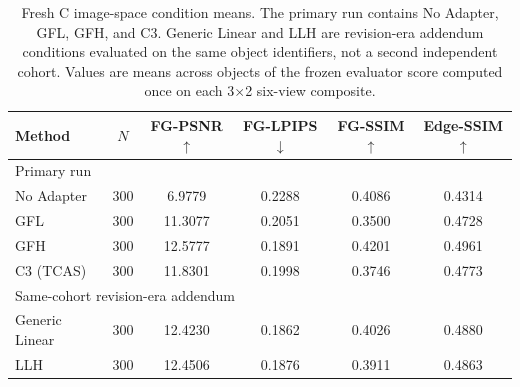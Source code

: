 \documentclass[times,twocolumn,final]{elsarticle}
\providecommand{\DIFadd}[1]{{\protect\color{blue} \sf #1}} %
\providecommand{\DIFaddbegin}{} %
\providecommand{\DIFaddend}{} %
\providecommand{\DIFaddFL}[1]{\DIFadd{#1}} %
\providecommand{\DIFaddbeginFL}{\DIFaddbegin} %
\providecommand{\DIFaddendFL}{\DIFaddend} %
\renewcommand{\DIFaddbeginFL}{}
\renewcommand{\DIFaddendFL}{}
\renewcommand{\DIFaddFL}[1]{#1}
\begin{document}
 
 \DIFaddbeginFL \begin{table}[t]
\DIFaddendFL \centering
  \DIFaddbeginFL \caption{Fresh C image-space condition means. The primary run contains No Adapter, GFL, GFH, and C3. Generic Linear and LLH are revision-era addendum conditions evaluated on the same object identifiers, not a second independent cohort. Values are means across objects of the frozen evaluator score computed once on each 3$\times$2 six-view composite.}
\label{tab:freshc-absolute}
\scriptsize\setlength{\tabcolsep}{4pt}
\begin{tabular}{lccccc}
\DIFaddendFL \toprule
  \DIFaddbeginFL \DIFaddFL{Method }\DIFaddendFL &   \DIFaddbeginFL \DIFaddFL{$N$ }\DIFaddendFL &   \DIFaddbeginFL \DIFaddFL{FG-PSNR$\uparrow$ }\DIFaddendFL &   \DIFaddbeginFL \DIFaddFL{FG-LPIPS$\downarrow$ }\DIFaddendFL &   \DIFaddbeginFL \DIFaddFL{FG-SSIM$\uparrow$ }& \DIFaddFL{Edge-SSIM$\uparrow$ }\DIFaddendFL \\
\midrule
\DIFaddbeginFL \multicolumn{6}{l}{Primary run} \\
\DIFaddFL{No Adapter }& \DIFaddFL{300 }& \DIFaddFL{6.9779 }& \DIFaddFL{0.2288 }& \DIFaddFL{0.4086 }& \DIFaddFL{0.4314 }\\
\DIFaddFL{GFL }& \DIFaddFL{300 }& \DIFaddFL{11.3077 }& \DIFaddFL{0.2051 }& \DIFaddFL{0.3500 }& \DIFaddFL{0.4728 }\\
\DIFaddFL{GFH }& \DIFaddFL{300 }& \DIFaddFL{12.5777 }& \DIFaddFL{0.1891 }& \DIFaddFL{0.4201 }& \DIFaddFL{0.4961 }\\
\DIFaddendFL C3 \DIFaddbeginFL \DIFaddFL{(TCAS) }\DIFaddendFL &   \DIFaddbeginFL \DIFaddFL{300 }\DIFaddendFL &   \DIFaddbeginFL \DIFaddFL{11.8301 }\DIFaddendFL &   \DIFaddbeginFL \DIFaddFL{0.1998 }\DIFaddendFL &   \DIFaddbeginFL \DIFaddFL{0.3746 }& \DIFaddFL{0.4773 }\DIFaddendFL \\
  \DIFaddbeginFL \midrule
\multicolumn{6}{l}{Same-cohort revision-era addendum} \\
\DIFaddFL{Generic Linear }\DIFaddendFL &   \DIFaddbeginFL \DIFaddFL{300 }\DIFaddendFL &   \DIFaddbeginFL \DIFaddFL{12.4230 }\DIFaddendFL &   \DIFaddbeginFL \DIFaddFL{0.1862 }\DIFaddendFL &   \DIFaddbeginFL \DIFaddFL{0.4026 }& \DIFaddFL{0.4880 }\DIFaddendFL \\
  \DIFaddbeginFL \DIFaddFL{LLH }\DIFaddendFL &   \DIFaddbeginFL \DIFaddFL{300 }\DIFaddendFL &   \DIFaddbeginFL \DIFaddFL{12.4506 }\DIFaddendFL &   \DIFaddbeginFL \DIFaddFL{0.1876 }\DIFaddendFL &   \DIFaddbeginFL \DIFaddFL{0.3911 }& \DIFaddFL{0.4863 }\DIFaddendFL \\
  \DIFaddbeginFL \bottomrule
\end{tabular}
\end{table}
\end{document}
